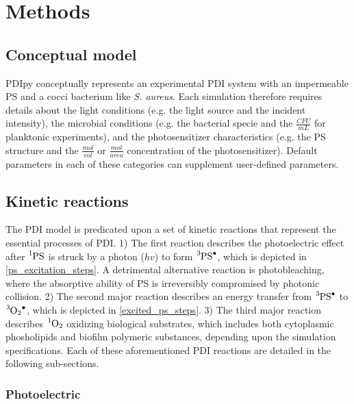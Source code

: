 \section*{Methods}
\subsection*{Conceptual model}
PDIpy conceptually represents an experimental PDI system with an impermeable PS and a cocci bacterium like \textit{S. aureus}. Each simulation therefore requires details about the light conditions (e.g. the light source and the incident intensity), the microbial conditions (e.g. the bacterial specie and the $\frac{CFU}{mL}$ for planktonic experiments), and the photosensitizer characteristics (e.g. the PS structure and the $\frac{mol}{vol}$ or $\frac{mol}{area}$ concentration of the photosensitizer). Default parameters in each of these categories can supplement user-defined parameters. 

\subsection*{Kinetic reactions}
The PDI model is predicated upon a set of kinetic reactions that represent the essential processes of PDI. 1) The first reaction describes the photoelectric effect \cite{Wheaton2009PhotoelectricEffect} after $\ce{^1PS}$ is struck by a photon ($hv$) to form $\ce{^3PS^.}$, which is depicted in \cref{ps_excitation_steps}. A detrimental alternative reaction is photobleaching, where the absorptive ability of PS is irreversibly compromised by photonic collision. 2) The second major reaction describes an energy transfer from $\ce{^3PS^.}$ to $\ce{^3O2^.}$, which is depicted in \cref{excited_ps_steps}. 3) The third major reaction describes $\ce{^1O2}$ oxidizing biological substrates, which includes both cytoplasmic phosholipids and biofilm polymeric substances, depending upon the simulation specifications. Each of these aforementioned PDI reactions are detailed in the following sub-sections.

\subsubsection*{Photoelectric}
